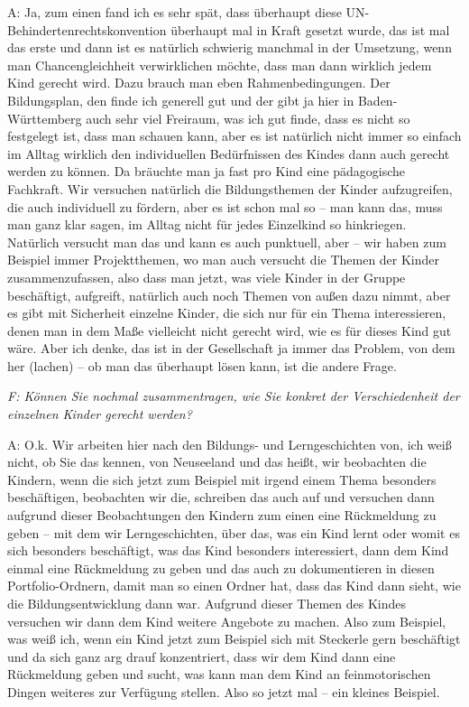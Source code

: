 A: Ja, zum einen fand ich es sehr spät, dass überhaupt diese UN-Behindertenrechtskonvention überhaupt mal in Kraft gesetzt wurde, das ist mal das erste und dann ist es natürlich schwierig manchmal in der Umsetzung, wenn man Chancengleichheit verwirklichen möchte, dass man dann wirklich jedem Kind gerecht wird. Dazu brauch man eben Rahmenbedingungen. Der Bildungsplan, den finde ich generell gut und der gibt ja hier in Baden-Württemberg auch sehr viel Freiraum, was ich gut finde, dass es nicht so festgelegt ist, dass man schauen kann, aber es ist natürlich nicht immer so einfach im Alltag wirklich den individuellen Bedürfnissen des Kindes dann auch gerecht werden zu können. Da bräuchte man ja fast pro Kind eine pädagogische Fachkraft. Wir versuchen natürlich die Bildungsthemen der Kinder aufzugreifen, die auch individuell zu fördern, aber es ist schon mal so – man kann das, muss man ganz klar sagen, im Alltag nicht für jedes Einzelkind so hinkriegen. Natürlich versucht man das und kann es auch punktuell, aber – wir haben zum Beispiel immer Projektthemen, wo man auch versucht die Themen der Kinder zusammenzufassen, also dass man jetzt, was viele Kinder in der Gruppe beschäftigt, aufgreift, natürlich auch noch Themen von außen dazu nimmt, aber es gibt mit Sicherheit einzelne Kinder, die sich nur für ein Thema interessieren, denen man in dem Maße vielleicht nicht gerecht wird, wie es für dieses Kind gut wäre.  
Aber ich denke, das ist in der Gesellschaft ja immer das Problem, von dem her (lachen) – ob man das überhaupt lösen kann, ist die andere Frage.

\emph{F: Können Sie nochmal zusammentragen, wie Sie konkret der Verschiedenheit der einzelnen Kinder gerecht werden?}

A: O.k. Wir arbeiten hier nach den Bildungs- und Lerngeschichten von, ich weiß nicht, ob Sie das kennen, von Neuseeland und das heißt, wir beobachten die Kindern, wenn die sich jetzt zum Beispiel mit irgend einem Thema besonders beschäftigen, beobachten wir die, schreiben das auch auf und versuchen dann aufgrund dieser Beobachtungen den Kindern zum einen eine Rückmeldung zu geben – mit dem wir Lerngeschichten, über das, was ein Kind lernt oder womit es sich besonders beschäftigt, was das Kind besonders interessiert, dann dem Kind einmal eine Rückmeldung zu geben und das auch zu dokumentieren in diesen Portfolio-Ordnern, damit man so einen Ordner hat, dass das Kind dann sieht, wie die Bildungsentwicklung dann war. Aufgrund dieser Themen des Kindes versuchen wir dann dem Kind weitere Angebote zu machen. Also zum Beispiel, was weiß ich, wenn ein Kind jetzt zum Beispiel sich mit Steckerle gern beschäftigt und da sich ganz arg drauf konzentriert, dass wir dem Kind dann eine Rückmeldung geben und sucht, was kann man dem Kind an feinmotorischen Dingen weiteres zur Verfügung stellen. Also so jetzt mal -- ein kleines Beispiel.


